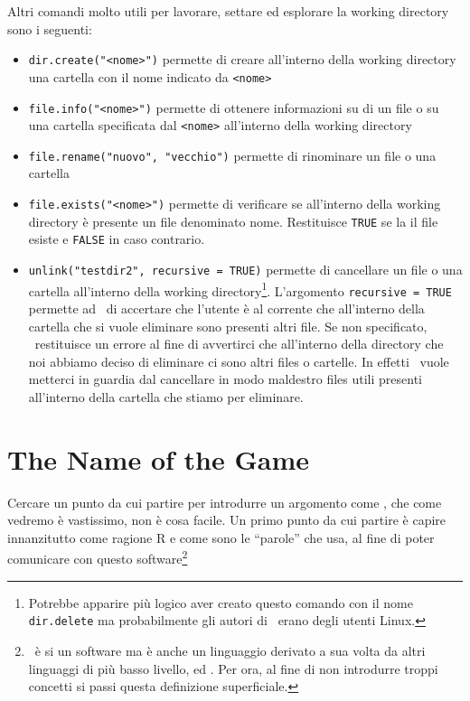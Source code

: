 Altri comandi molto utili per lavorare, settare ed esplorare la working directory sono i seguenti:
\begin{itemize}

\item \lstinline!dir.create("<nome>")! permette di creare all'interno della working directory una cartella con il nome indicato da \lstinline!<nome>!
\item \lstinline!file.info("<nome>")! permette di ottenere informazioni su di un file o su una cartella specificata dal \lstinline!<nome>! all'interno della working directory
\item \lstinline!file.rename("nuovo", "vecchio")!  permette di rinominare un file o una cartella
\item \lstinline!file.exists("<nome>")! permette di verificare se all'interno della working directory è presente un file denominato \textsf{nome}. Restituisce \lstinline!TRUE! se la il file esiste e \lstinline!FALSE! in caso contrario.
\item \lstinline!unlink("testdir2", recursive = TRUE)! permette di cancellare un file o una cartella all'interno della working directory\footnote{Potrebbe apparire più logico aver creato questo comando con il nome \lstinline!dir.delete! ma probabilmente gli autori di \erre\ erano degli utenti Linux.}. L'argomento \lstinline!recursive = TRUE! permette ad \erre\ di accertare che l'utente è al corrente che all'interno della cartella che si vuole eliminare sono presenti altri file. Se non specificato, \erre\ restituisce un errore al fine di avvertirci che all'interno della directory che noi abbiamo deciso di eliminare ci sono altri files o cartelle. In effetti \erre\ vuole metterci in guardia dal cancellare in modo maldestro files utili presenti all'interno della cartella che stiamo per eliminare.
\end{itemize}

\section{The Name of the Game}

Cercare un punto da cui partire per introdurre un argomento come \erre, che come vedremo è vastissimo, non è cosa facile.
Un primo punto da cui partire è capire innanzitutto come ragione R e come sono le ``parole'' che usa, al fine di poter comunicare con questo software\footnote{\erre\ è si un software ma è anche un linguaggio derivato a sua volta da altri linguaggi di più basso livello,  ed . Per ora, al fine di non introdurre troppi concetti si passi questa definizione superficiale.}

